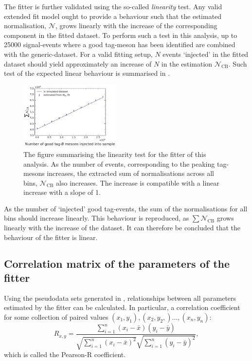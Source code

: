 The fitter is further validated using the so-called \textit{linearity} test.
Any valid extended fit model ought to provide a behaviour such that the estimated normalisation, $\mathcal{N}$, grows linearly with the increase of the corresponding component in the fitted dataset.
To perform such a test in this analysis, up to 25000 \BtoXsgamma signal-\MC events where a good tag-\B meson has been identified are combined with the generic-\MC dataset.
For a valid fitting setup, $N$ events `injected' in the fitted dataset should yield approximately an increase of $N$ in the estimation $\mathcal{N}_{\mathrm{CB}}$.
Such test of the expected linear behaviour is summarised in .

\begin{figure}[htbp!]
    \centering
    \includegraphics[width=0.45\textwidth]{figures/mc_validation/linearity_check_longer.pdf}
    \caption{\label{fig:linearity_test}The figure summarising the linearity test for the \Mbc fitter of this analysis.
    As the number of events, corresponding to the peaking tag-\B mesons increases, the extracted sum of normalisations across all bins, $\mathcal{N}_{\mathrm{CB}}$ also increases.
    The increase is compatible with a linear increase with a slope of 1.
    }
\end{figure}

As the number of `injected' good tag-\B events, the sum of the normalisations for all \EB bins should increase linearly.
This behaviour is reproduced, as $\sum \mathcal{N}_{\mathrm{CB}}$ grows linearly with the increase of the dataset.
It can therefore be concluded that the behaviour of the \Mbc fitter is linear.

\subsection{Correlation matrix of the parameters of the \texorpdfstring{\Mbc}{Mbc} fitter}\label{sec:correlation_matrix}

Using the pseudodata sets generated in , relationships between all parameters estimated by the \Mbc fitter can be calculated.
In particular, a correlation coefficient for some collection of paired values ${(x_1,y_1),(x_2,y_2,)...,(x_n,y_n)}$:
\begin{equation}\label{eq:pearson_r}
    R_{x,y}=\frac{\sum_{i=1}^n\left(x_i-\bar{x}\right)\left(y_i-\bar{y}\right)}{\sqrt{\sum_{i=1}^n\left(x_i-\bar{x}\right)^2} \sqrt{\sum_{i=1}^n\left(y_i-\bar{y}\right)^2}},
\end{equation}
which is called the Pearson-R coefficient.

